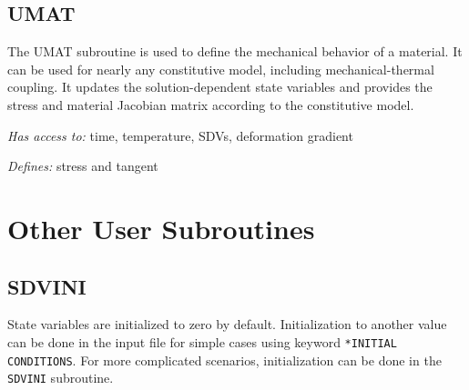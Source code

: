 \documentclass[10pt,letterpaper,oneside]{report}
\begin{document}


\subsection{UMAT}
The UMAT subroutine is used to define the mechanical behavior of a material.  It can be used for nearly any constitutive model, including mechanical-thermal coupling.  It updates the solution-dependent state variables and provides the stress and material Jacobian matrix according to the constitutive model.  

\emph{Has access to:} time, temperature, SDVs, deformation gradient

\emph{Defines:} stress and tangent





\newpage
\section{Other User Subroutines}

\subsection{SDVINI}
State variables are initialized to zero by default.  Initialization to another value can be done in the input file for simple cases using keyword \texttt{*INITIAL CONDITIONS}.  For more complicated scenarios, initialization can be done in the \texttt{SDVINI} subroutine.
\end{document}

